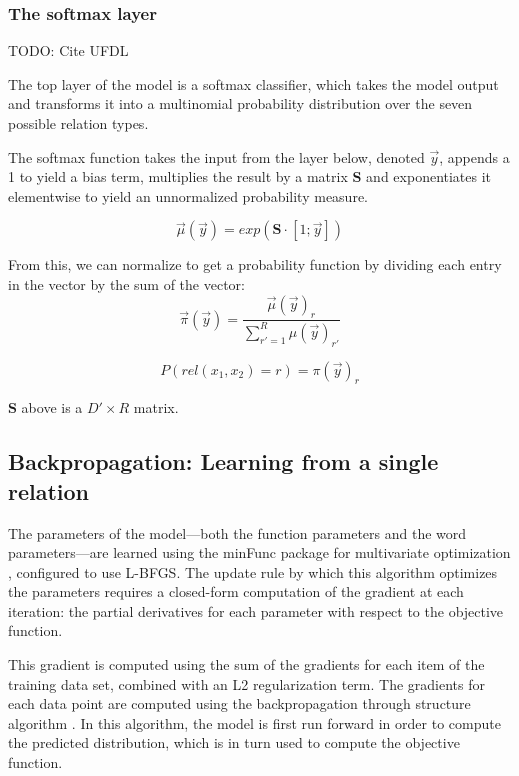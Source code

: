 \documentclass[10pt,letterpaper]{article}
\begin{document}
\subsubsection{The softmax layer}

TODO: Cite UFDL

The top layer of the model is a softmax classifier, which takes the model output and transforms it into a multinomial probability distribution over the seven possible relation types.

The softmax function takes the input from the layer below, denoted $\vec{y}$, appends a 1 to yield a bias term, multiplies the result by a matrix $\mathbf{S}$ and exponentiates it elementwise to yield an unnormalized probability measure.

\begin{equation}
\vec{\mu}(\vec{y}) = exp(\mathbf{S}\cdot[1; \vec{y}])
\end{equation}

From this, we can normalize to get a probability function by dividing each entry in the vector by the sum of the vector:
\begin{equation}
\vec{\pi}(\vec{y}) = \frac{\vec{\mu}(\vec{y})_r}{\sum_{r' = 1}^R \mu(\vec{y})_{r'}}
\end{equation}

\begin{equation}
P(rel(x_1, x_2)=r) = \pi(\vec{y})_r
\end{equation}

$\mathbf{S}$ above is a $D' \times R$ matrix.


\subsection{Backpropagation: Learning from a single relation}

The parameters of the model---both the function parameters and the word parameters---are learned using the minFunc package for multivariate optimization , configured to use L-BFGS. The update rule by which this algorithm optimizes the parameters requires a closed-form computation of the gradient at each iteration: the partial derivatives for each parameter with respect to the objective function.

This gradient is computed using the sum of the gradients for each item of the training data set, combined with an L2 regularization term. The gradients for each data point are computed using the backpropagation through structure algorithm \cite{goller1996learning}. In this algorithm, the model is first run forward in order to compute the predicted distribution, which is in turn used to compute the objective function. 
\end{document}
